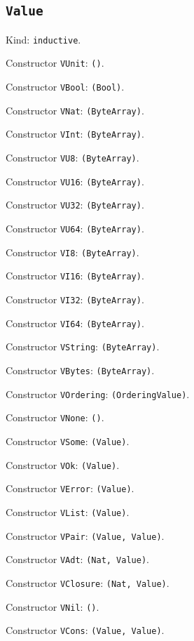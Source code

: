 \documentclass[11pt]{article}
\begin{document}
\subsection*{\texttt{Value}}
\noindent Kind: \texttt{inductive}.\par
\noindent Constructor \texttt{VUnit}: \texttt{()}.\par
\noindent Constructor \texttt{VBool}: \texttt{(Bool)}.\par
\noindent Constructor \texttt{VNat}: \texttt{(ByteArray)}.\par
\noindent Constructor \texttt{VInt}: \texttt{(ByteArray)}.\par
\noindent Constructor \texttt{VU8}: \texttt{(ByteArray)}.\par
\noindent Constructor \texttt{VU16}: \texttt{(ByteArray)}.\par
\noindent Constructor \texttt{VU32}: \texttt{(ByteArray)}.\par
\noindent Constructor \texttt{VU64}: \texttt{(ByteArray)}.\par
\noindent Constructor \texttt{VI8}: \texttt{(ByteArray)}.\par
\noindent Constructor \texttt{VI16}: \texttt{(ByteArray)}.\par
\noindent Constructor \texttt{VI32}: \texttt{(ByteArray)}.\par
\noindent Constructor \texttt{VI64}: \texttt{(ByteArray)}.\par
\noindent Constructor \texttt{VString}: \texttt{(ByteArray)}.\par
\noindent Constructor \texttt{VBytes}: \texttt{(ByteArray)}.\par
\noindent Constructor \texttt{VOrdering}: \texttt{(OrderingValue)}.\par
\noindent Constructor \texttt{VNone}: \texttt{()}.\par
\noindent Constructor \texttt{VSome}: \texttt{(Value)}.\par
\noindent Constructor \texttt{VOk}: \texttt{(Value)}.\par
\noindent Constructor \texttt{VError}: \texttt{(Value)}.\par
\noindent Constructor \texttt{VList}: \texttt{(Value)}.\par
\noindent Constructor \texttt{VPair}: \texttt{(Value, Value)}.\par
\noindent Constructor \texttt{VAdt}: \texttt{(Nat, Value)}.\par
\noindent Constructor \texttt{VClosure}: \texttt{(Nat, Value)}.\par
\noindent Constructor \texttt{VNil}: \texttt{()}.\par
\noindent Constructor \texttt{VCons}: \texttt{(Value, Value)}.\par
\end{document}

